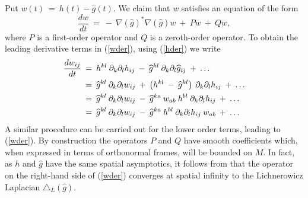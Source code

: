 \documentclass[12pt]{amsart}
\numberwithin{equation}{section}
\theoremstyle{plain}
\theoremstyle{definition}
\theoremstyle{remark}
\begin{document}
Put $w(t) \: = \: h(t) - \widehat{g}(t)$. We claim that
$w$ satisfies an equation of the form
\begin{equation} \label{wder}
\frac{dw}{dt} \: = \: - \: \nabla(\widehat{g})^* \nabla(\widehat{g}) w
\: + \: Pw \: + \: Qw,
\end{equation}
where $P$ is a first-order operator and $Q$ is a zeroth-order
operator. To obtain the leading derivative terms in (\ref{wder}), 
using (\ref{hder}) we write
\begin{align}
\frac{dw_{ij}}{dt} \: & = \: h^{kl} \: \partial_k \partial_l h_{ij} \: - \:
\widehat{g}^{kl} \: \partial_k \partial_l \widehat{g}_{ij} \: + \: \ldots \\
& = \:
\widehat{g}^{kl} \: \partial_k \partial_l w_{ij} \: + \:
\left( h^{kl} \: - \: \widehat{g}^{kl} \right) \:
\partial_k \partial_l h_{ij} \: + \: \ldots \notag \\
& = \:
\widehat{g}^{kl} \: \partial_k \partial_l w_{ij} \: - \:
\widehat{g}^{ka} \: w_{ab} \: h^{bl} \:
\partial_k \partial_l h_{ij} \: + \: \ldots \notag \\
& = \:
\widehat{g}^{kl} \: \partial_k \partial_l w_{ij} \: - \:
\widehat{g}^{ka} \: h^{bl} \:
\partial_k \partial_l h_{ij} \: w_{ab} \: + \: \ldots \notag
\end{align}
A similar procedure can be carried out for the lower order terms,
leading to (\ref{wder}). By construction the operators $P$ and $Q$
have smooth coefficients which, when expressed in terms of orthonormal frames,
will be bounded on $M$. In fact, as
$h$ and $\widehat{g}$
have the same spatial asymptotics, it follows from
\cite[Proposition 4]{Anderson-Chow} that
the operator on the right-hand side of (\ref{wder}) converges at
spatial infinity to
the Lichnerowicz Laplacian $\triangle_L(\widehat{g})$.
\end{document}
